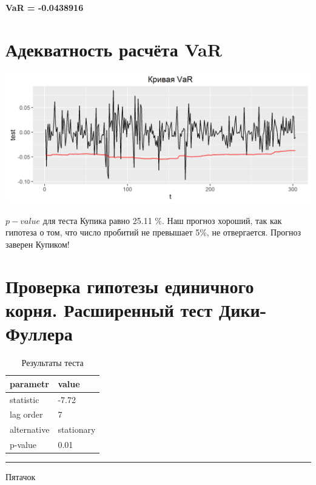 \documentclass [12pt, a4paper]{article}\usepackage[]{graphicx}\usepackage[]{color}
\makeatletter
\def\maxwidth{ %
  \ifdim\Gin@nat@width>\linewidth
    \linewidth
  \else
    \Gin@nat@width
  \fi
}
\newenvironment{knitrout}{}{} %
\makeatother
\begin{document}
\vfill
 \begin{center}
 \textbf {\Large VaR = -0.0438916}
 \end{center}
 
\clearpage
\section {Адекватность расчёта VaR}
 
 
\begin{knitrout}
\color{fgcolor}

{\centering \includegraphics[width=\maxwidth]{figure/Var_curve-1} 

}



\end{knitrout}



$p-value$ для теста Купика равно 25.11 \%. \ifstrequal{good}{good}{Наш прогноз хороший, так как гипотеза о том, что число пробитий не превышает 5\%, не отвергается. Прогноз заверен Купиком!}{Наш прогноз плохой, так как гипотеза о том, что число пробитий не превышает 5\%, отвергается.}

\section{Проверка гипотезы единичного корня. Расширенный тест Дики-Фуллера}



\begin{table}[h!]
 \caption{Результаты теста}
 \begin{center}
  
\begin{tabular}{l|l}
\hline
parametr & value\\
\hline
statistic & -7.72\\
\hline
lag order & 7\\
\hline
alternative & stationary\\
\hline
p-value & 0.01\\
\hline
\end{tabular}


 \end{center}
\end{table}

\vfill

 \begin{flushright}
 \rule{5em}{0.5pt} Пятачок
 \end{flushright}
\end{document}
